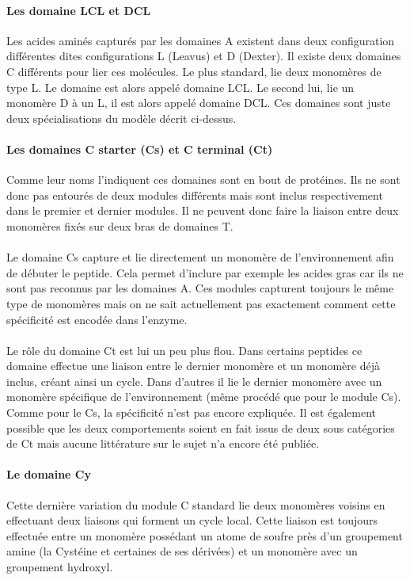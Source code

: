 \documentclass[12pt,french,twoside]{report}
\begin{document}
\paragraph{Les domaine LCL et DCL}
Les acides aminés capturés par les domaines A existent dans deux configuration différentes dites configurations L (Leavus) et D (Dexter).
Il existe deux domaines C différents pour lier ces molécules.
Le plus standard, lie deux monomères de type L. Le domaine est alors appelé domaine LCL.
Le second lui, lie un monomère D à un L, il est alors appelé domaine DCL.
Ces domaines sont juste deux spécialisations du modèle décrit ci-dessus.

\paragraph{Les domaines C starter (Cs) et C terminal (Ct)}
Comme leur noms l'indiquent ces domaines sont en bout de protéines.
Ils ne sont donc pas entourés de deux modules différents mais sont inclus respectivement dans le premier et dernier modules.
Il ne peuvent donc faire la liaison entre deux monomères fixés sur deux bras de domaines T.

\paragraph{}Le domaine Cs capture et lie directement un monomère de l'environnement afin de débuter le peptide.
Cela permet d'inclure par exemple les acides gras car ils ne sont pas reconnus par les domaines A.
Ces modules capturent toujours le même type de monomères mais on ne sait actuellement pas exactement comment cette spécificité est encodée dans l'enzyme.

\paragraph{}Le rôle du domaine Ct est lui un peu plus flou.
Dans certains peptides ce domaine effectue une liaison entre le dernier monomère et un monomère déjà inclus, créant ainsi un cycle\cite{gao_cyclization_2012}.
Dans d'autres il lie le dernier monomère avec un monomère spécifique de l'environnement (même procédé que pour le module Cs).
Comme pour le Cs, la spécificité n'est pas encore expliquée.
Il est également possible que les deux comportements soient en fait issus de deux sous catégories de Ct mais aucune littérature sur le sujet n'a encore été publiée.

\paragraph{Le domaine Cy}
Cette dernière variation du module C standard lie deux monomères voisins en effectuant deux liaisons qui forment un cycle local.
Cette liaison est toujours effectuée entre un monomère possédant un atome de soufre près d'un groupement amine (la Cystéine et certaines de ses dérivées) et un monomère avec un groupement hydroxyl.
\end{document}
